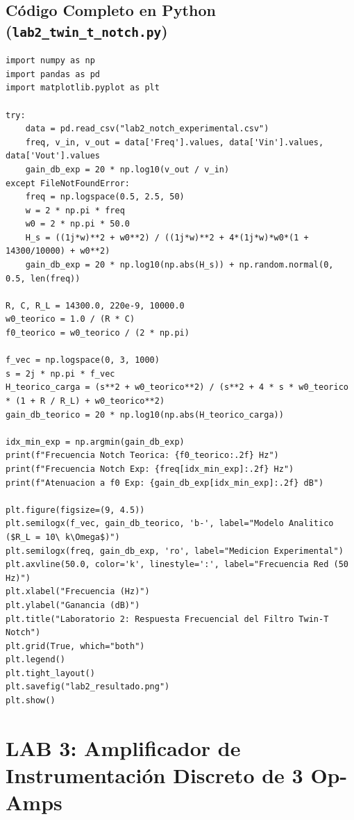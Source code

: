 \documentclass[10pt,a4paper,twoside]{article}
\begin{document}
\subsection{Código Completo en Python (\texttt{lab2\_twin\_t\_notch.py})}
\begin{lstlisting}
import numpy as np
import pandas as pd
import matplotlib.pyplot as plt

try:
    data = pd.read_csv("lab2_notch_experimental.csv")
    freq, v_in, v_out = data['Freq'].values, data['Vin'].values, data['Vout'].values
    gain_db_exp = 20 * np.log10(v_out / v_in)
except FileNotFoundError:
    freq = np.logspace(0.5, 2.5, 50)
    w = 2 * np.pi * freq
    w0 = 2 * np.pi * 50.0
    H_s = ((1j*w)**2 + w0**2) / ((1j*w)**2 + 4*(1j*w)*w0*(1 + 14300/10000) + w0**2)
    gain_db_exp = 20 * np.log10(np.abs(H_s)) + np.random.normal(0, 0.5, len(freq))

R, C, R_L = 14300.0, 220e-9, 10000.0
w0_teorico = 1.0 / (R * C)
f0_teorico = w0_teorico / (2 * np.pi)

f_vec = np.logspace(0, 3, 1000)
s = 2j * np.pi * f_vec
H_teorico_carga = (s**2 + w0_teorico**2) / (s**2 + 4 * s * w0_teorico * (1 + R / R_L) + w0_teorico**2)
gain_db_teorico = 20 * np.log10(np.abs(H_teorico_carga))

idx_min_exp = np.argmin(gain_db_exp)
print(f"Frecuencia Notch Teorica: {f0_teorico:.2f} Hz")
print(f"Frecuencia Notch Exp: {freq[idx_min_exp]:.2f} Hz")
print(f"Atenuacion a f0 Exp: {gain_db_exp[idx_min_exp]:.2f} dB")

plt.figure(figsize=(9, 4.5))
plt.semilogx(f_vec, gain_db_teorico, 'b-', label="Modelo Analitico ($R_L = 10\ k\Omega$)")
plt.semilogx(freq, gain_db_exp, 'ro', label="Medicion Experimental")
plt.axvline(50.0, color='k', linestyle=':', label="Frecuencia Red (50 Hz)")
plt.xlabel("Frecuencia (Hz)")
plt.ylabel("Ganancia (dB)")
plt.title("Laboratorio 2: Respuesta Frecuencial del Filtro Twin-T Notch")
plt.grid(True, which="both")
plt.legend()
plt.tight_layout()
plt.savefig("lab2_resultado.png")
plt.show()
\end{lstlisting}

\newpage
\section{LAB 3: Amplificador de Instrumentación Discreto de 3 Op-Amps}
\end{document}
